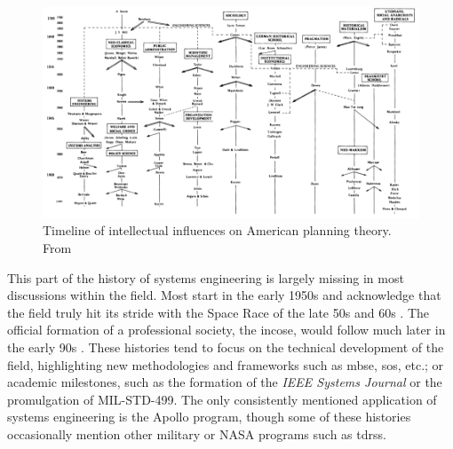 \clearpage
\begin{landscape}
\begin{figure}[t]
	\centering
	\includegraphics[width=1.3\textwidth]{Figures/chap2/friedman_timeline.png}
	\caption[Timeline of intellectual influences on American planning theory]{Timeline of intellectual influences on American planning theory. From \cite{mazza2017}}
	\label{fig:friedman_timeline}
\end{figure}
\end{landscape}
\clearpage

This part of the history of systems engineering is largely missing in most discussions within the field. Most start in the early 1950s and acknowledge that the field truly hit its stride with the Space Race of the late 50s and 60s \cite{gorodSystemofSystemsEngineeringManagement2008, bootonDevelopmentSystemsEngineering1984, hallHallMethodologySystems1962, brillSystemsEngineeringRetrospective1998}. The official formation of a professional society, the \ac{incose}, would follow much later in the early 90s \cite{honourINCOSEHistoryInternational1998}. These histories tend to focus on the technical development of the field, highlighting new methodologies and frameworks such as \ac{mbse}, \ac{sos}, etc.; or academic milestones, such as the formation of the \textit{IEEE Systems Journal} or the promulgation of MIL-STD-499. The only consistently mentioned application of systems engineering is the Apollo program, though some of these histories occasionally mention other military or NASA programs such as \ac{tdrss}.

